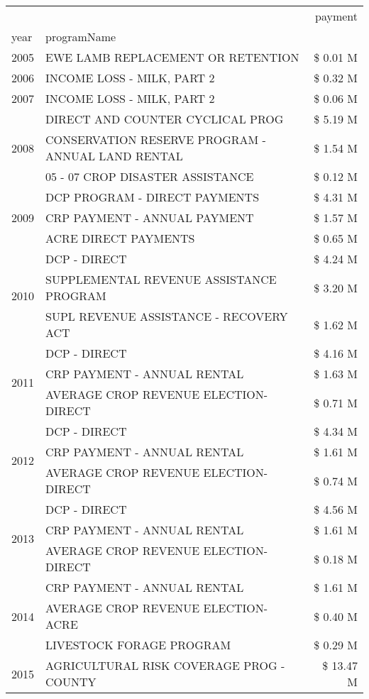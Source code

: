 \begin{tabular}{llr}
\toprule
 &  & payment \\
year & programName &  \\
\midrule
2005 & EWE LAMB REPLACEMENT OR RETENTION & \$ 0.01 M \\
\cline{1-3}
2006 & INCOME LOSS - MILK, PART 2 & \$ 0.32 M \\
\cline{1-3}
2007 & INCOME LOSS - MILK, PART 2 & \$ 0.06 M \\
\cline{1-3}
\multirow[t]{3}{*}{2008} & DIRECT AND COUNTER CYCLICAL PROG & \$ 5.19 M \\
 & CONSERVATION RESERVE PROGRAM - ANNUAL LAND RENTAL & \$ 1.54 M \\
 & 05 - 07 CROP DISASTER ASSISTANCE & \$ 0.12 M \\
\cline{1-3}
\multirow[t]{3}{*}{2009} & DCP PROGRAM - DIRECT PAYMENTS & \$ 4.31 M \\
 & CRP PAYMENT - ANNUAL PAYMENT & \$ 1.57 M \\
 & ACRE DIRECT PAYMENTS & \$ 0.65 M \\
\cline{1-3}
\multirow[t]{3}{*}{2010} & DCP - DIRECT & \$ 4.24 M \\
 & SUPPLEMENTAL REVENUE ASSISTANCE PROGRAM & \$ 3.20 M \\
 & SUPL REVENUE ASSISTANCE - RECOVERY ACT & \$ 1.62 M \\
\cline{1-3}
\multirow[t]{3}{*}{2011} & DCP - DIRECT & \$ 4.16 M \\
 & CRP PAYMENT - ANNUAL RENTAL & \$ 1.63 M \\
 & AVERAGE CROP REVENUE ELECTION-DIRECT & \$ 0.71 M \\
\cline{1-3}
\multirow[t]{3}{*}{2012} & DCP - DIRECT & \$ 4.34 M \\
 & CRP PAYMENT - ANNUAL RENTAL & \$ 1.61 M \\
 & AVERAGE CROP REVENUE ELECTION-DIRECT & \$ 0.74 M \\
\cline{1-3}
\multirow[t]{3}{*}{2013} & DCP - DIRECT & \$ 4.56 M \\
 & CRP PAYMENT - ANNUAL RENTAL & \$ 1.61 M \\
 & AVERAGE CROP REVENUE ELECTION-DIRECT & \$ 0.18 M \\
\cline{1-3}
\multirow[t]{3}{*}{2014} & CRP PAYMENT - ANNUAL RENTAL & \$ 1.61 M \\
 & AVERAGE CROP REVENUE ELECTION-ACRE & \$ 0.40 M \\
 & LIVESTOCK FORAGE PROGRAM & \$ 0.29 M \\
\cline{1-3}
\multirow[t]{3}{*}{2015} & AGRICULTURAL RISK COVERAGE PROG - COUNTY & \$ 13.47 M \\

\end{tabular}
